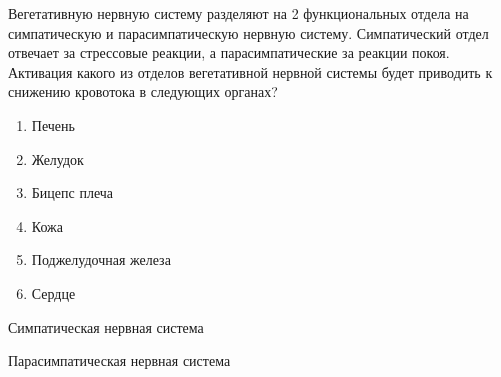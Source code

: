 
Вегетативную нервную систему разделяют на 2 функциональных отдела на симпатическую и 
парасимпатическую нервную систему. Симпатический отдел отвечает за стрессовые реакции, 
а парасимпатические за реакции покоя. Активация какого из отделов вегетативной нервной 
системы будет приводить к снижению кровотока в следующих органах?

\begin{enumerate}
    \item Печень
    \item Желудок
    \item Бицепс плеча
    \item Кожа
    \item Поджелудочная железа
    \item Сердце
\end{enumerate}
    
Симпатическая нервная система

Парасимпатическая нервная система

